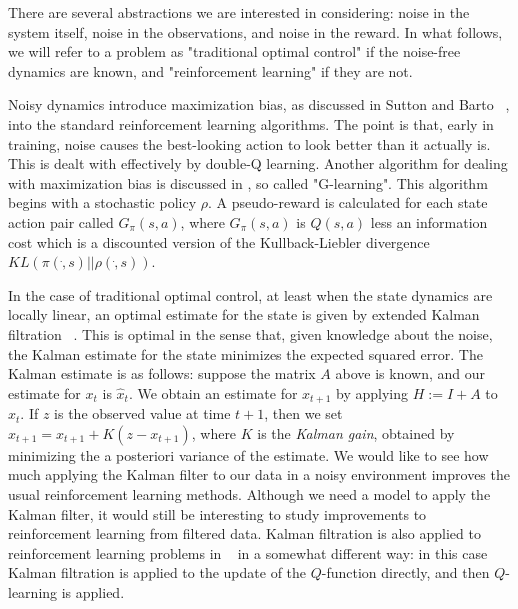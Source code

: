 \documentclass{article}
\begin{document}
There are several abstractions we are interested in considering: noise in the system itself, noise in the observations, and noise in the reward. In what follows, we will refer to a problem as "traditional optimal control" if the noise-free dynamics are known, and "reinforcement learning" if they are not. 

Noisy dynamics introduce maximization bias, as discussed in Sutton and Barto ~\cite{suttonAndBarto}, into the standard reinforcement learning algorithms. The point is that, early in training, noise causes the best-looking action to look better than it actually is. This is dealt with effectively by double-Q learning. Another algorithm for dealing with maximization bias is discussed in \cite{foxPakmanTishby}, so called "G-learning". This algorithm begins with a stochastic policy $\rho$. A pseudo-reward is calculated for each state action pair called $G_\pi(s,a)$, where $G_\pi(s,a)$ is $Q(s,a)$ less an information cost which is a discounted version of the Kullback-Liebler divergence $KL(\pi( \dot , s) || \rho( \dot , s))$.

In the case of traditional optimal control, at least when the state dynamics are locally linear, an  optimal estimate for the state is given by extended Kalman filtration ~\cite{welchBishop}. This is optimal in the sense that, given knowledge about the noise, the Kalman estimate for the state minimizes the expected squared error. The Kalman estimate is as follows: suppose the matrix $A$ above is known, and our estimate for $x_t$ is $\hat x_t$. We obtain an estimate for $x_{t+1}$ by applying $H := I+A$ to $\hat x_t$. If $z$ is the observed value at time $t+1$, then we set $\hat x_{t+1} = x_{t+1} + K (z - x_{t+1})$, where $K$ is the {\em Kalman gain}, obtained by minimizing the a posteriori variance of the estimate. We would like to see how much applying the Kalman filter to our data in a noisy environment improves the usual reinforcement learning methods. Although we need a model to apply the Kalman filter, it would still be interesting to study improvements to reinforcement learning from filtered data. Kalman filtration is also applied to reinforcement learning problems in ~\cite{trippSchacter} in a somewhat different way: in this case Kalman filtration is applied to the update of the $Q$-function directly, and then $Q$-learning is applied.
\end{document}
